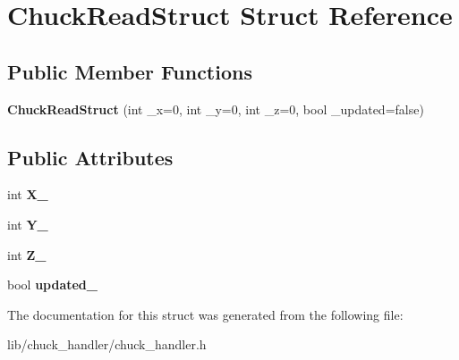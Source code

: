 \hypertarget{structChuckReadStruct}{}\section{Chuck\+Read\+Struct Struct Reference}
\label{structChuckReadStruct}
\subsection*{Public Member Functions}
\begin{DoxyCompactItemize}
\item 
{\bfseries Chuck\+Read\+Struct} (int \+\_\+x=0, int \+\_\+y=0, int \+\_\+z=0, bool \+\_\+updated=false)\hypertarget{structChuckReadStruct_a4d3862e08a50b7f574b07e352085e8d0}{}\label{structChuckReadStruct_a4d3862e08a50b7f574b07e352085e8d0}

\end{DoxyCompactItemize}
\subsection*{Public Attributes}
\begin{DoxyCompactItemize}
\item 
int {\bfseries X\+\_\+}\hypertarget{structChuckReadStruct_ae641b4e38d50e3599a9692a546e02c37}{}\label{structChuckReadStruct_ae641b4e38d50e3599a9692a546e02c37}

\item 
int {\bfseries Y\+\_\+}\hypertarget{structChuckReadStruct_a9f2009cdfd22ab1f64b501d2ebf0813f}{}\label{structChuckReadStruct_a9f2009cdfd22ab1f64b501d2ebf0813f}

\item 
int {\bfseries Z\+\_\+}\hypertarget{structChuckReadStruct_ae6764e76094182d41a6a600551b2a7b8}{}\label{structChuckReadStruct_ae6764e76094182d41a6a600551b2a7b8}

\item 
bool {\bfseries updated\+\_\+}\hypertarget{structChuckReadStruct_a1cf443581caa75004803392685d24964}{}\label{structChuckReadStruct_a1cf443581caa75004803392685d24964}

\end{DoxyCompactItemize}


The documentation for this struct was generated from the following file\+:\begin{DoxyCompactItemize}
\item 
lib/chuck\+\_\+handler/chuck\+\_\+handler.\+h\end{DoxyCompactItemize}
